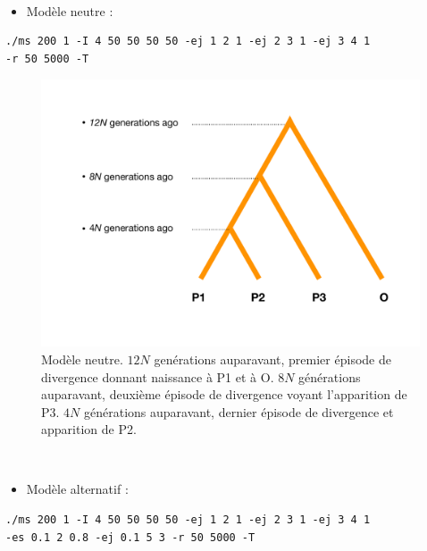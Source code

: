 \documentclass[12pt,a4paper,twoside]{ugathesis}
\providecommand{\tightlist}{%
  \setlength{\itemsep}{0pt}\setlength{\parskip}{0pt}}
\theoremstyle{definition}
\theoremstyle{definition}
\theoremstyle{remark}
\begin{document}
~
\begin{itemize}
\tightlist
\item
  Modèle neutre :
\end{itemize}
\begin{verbatim}
./ms 200 1 -I 4 50 50 50 50 -ej 1 2 1 -ej 2 3 1 -ej 3 4 1 
-r 50 5000 -T 
\end{verbatim}
\begin{figure}

{\centering \includegraphics[scale=0.5]{figure/background} 

}

\caption{Modèle neutre. $12N$ genérations auparavant, premier épisode de divergence donnant naissance à P1 et à O. $8N$ générations auparavant, deuxième épisode de divergence voyant l'apparition de P3. $4N$ générations auparavant, dernier épisode de divergence et apparition de P2.}\label{fig:background}
\end{figure}
~
\begin{itemize}
\tightlist
\item
  Modèle alternatif :
\end{itemize}
\begin{verbatim}
./ms 200 1 -I 4 50 50 50 50 -ej 1 2 1 -ej 2 3 1 -ej 3 4 1 
-es 0.1 2 0.8 -ej 0.1 5 3 -r 50 5000 -T
\end{verbatim}
\end{document}
